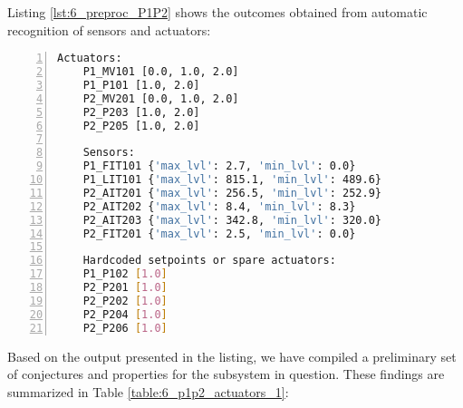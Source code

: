 Listing \ref{lst:6_preproc_P1P2} shows the outcomes obtained from automatic recognition of sensors and actuators:

\begin{lstlisting}[language=bash, numbers=left, caption=Preliminary analysis outcomes for sensors and actuators of \texttt{PLC1-2}, label=lst:6_preproc_P1P2]
	Actuators: 
	P1_MV101 [0.0, 1.0, 2.0]
	P1_P101 [1.0, 2.0]
	P2_MV201 [0.0, 1.0, 2.0]
	P2_P203 [1.0, 2.0]
	P2_P205 [1.0, 2.0]
	
	Sensors: 
	P1_FIT101 {'max_lvl': 2.7, 'min_lvl': 0.0}
	P1_LIT101 {'max_lvl': 815.1, 'min_lvl': 489.6}
	P2_AIT201 {'max_lvl': 256.5, 'min_lvl': 252.9}
	P2_AIT202 {'max_lvl': 8.4, 'min_lvl': 8.3}
	P2_AIT203 {'max_lvl': 342.8, 'min_lvl': 320.0}
	P2_FIT201 {'max_lvl': 2.5, 'min_lvl': 0.0}
	
	Hardcoded setpoints or spare actuators: 
	P1_P102 [1.0]
	P2_P201 [1.0]
	P2_P202 [1.0]
	P2_P204 [1.0]
	P2_P206 [1.0]
\end{lstlisting}

\noindent Based on the output presented in the listing, we have compiled a preliminary set of conjectures and properties for the subsystem in question. These findings are summarized in Table \ref{table:6_p1p2_actuators_1}:

